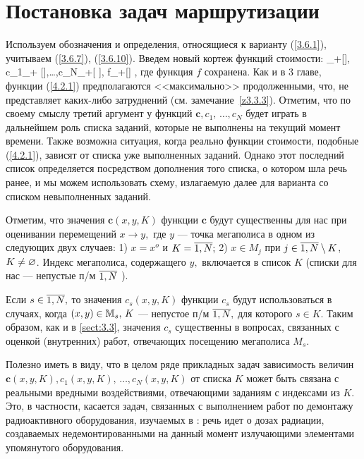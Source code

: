
\section{
  Постановка задач маршрутизации
}
\label{sect:4.2}
\setcounter{equation}{0}

Используем обозначения и определения,
относящиеся к варианту
(\ref{3.6.1}),
учитываем (\ref{3.6.7}), (\ref{3.6.10}).
Введем новый кортеж функций стоимости:
\bfn
  \label{4.2.1}
  \in \car_+[\bbx\times \bbx\times {}], c_1\in \car_+
  [\bbx\times \bbx\times {}],\ldots,c_N\in \car_+[\bbx\times
  \bbx\times {}], f\in \car_+[\bbx]
  ,
\efn
где функция $f$ сохранена.
Как и в 3 главе,
функции (\ref{4.2.1})
предполагаются <<максимально>> продолженными,
что, не представляет каких-либо затруднений
(см. замечание~\ref{z3.3.3}).
Отметим, что по своему смыслу третий аргумент у функций
$\mathbf{c}, c_1,\,\ldots,c_N$ будет
играть в дальнейшем роль списка заданий,
которые  не выполнены на текущий момент времени.
Также возможна ситуация, когда реально функции стоимости,
подобные (\ref{4.2.1}),
зависят  от списка уже выполненных заданий.
Однако этот последний список определяется посредством дополнения того списка,
о котором шла речь ранее, и мы можем использовать схему,
излагаемую далее для варианта со списком невыполненных заданий.

Отметим,
что значения $\mathbf{c}(x,y,K)$
функции $\mathbf{c}$
будут существенны для нас при оценивании перемещений
$x\rightarrow y,$ где $y$ ---
точка мегаполиса в одном из следующих двух случаев:
1) $x= x^o$ и $K = \ov{1,N};$
2) $x\in M_j$ при $j\in \ov{1,N}\sm K$, $K\neq \varnothing$.
Индекс мегаполиса,
содержащего $y,$ включается в список $K$
(списки для нас --- непустые п/м $\ov{1,N}$ ).

Если $s\in \ov{1,N},$
то значения $c_s(x,y,K)$
функции $c_s$ будут
использоваться в случаях, когда $(x,y)\in {\mathbb M}_s,\, K$ ---
непустое п/м
$\ov{1,N},$
для которого $s\in K.$
Таким образом, как и в \ref{sect:3.3},
значения $c_s$ существенны в вопросах,
связанных с оценкой
(внутренних)
работ,
отвечающих посещению мегаполиса $M_s.$

Полезно иметь в виду,
что в целом ряде прикладных задач зависимость величин
$\mathbf{c}(x,y,K), c_1(x,y,K),\,\ldots,c_N(x,y,K)$
от списка $K$
может быть связана с реальными вредными воздействиями,
отвечающими заданиям с индексами из $K.$
Это, в частности, касается задач, связанных с выполнением
работ по демонтажу радиоактивного оборудования,
изучаемых в \cite{Cha2`}:
речь идет о дозах радиации,
создаваемых недемонтированными на данный момент
излучающими элементами упомянутого оборудования.

